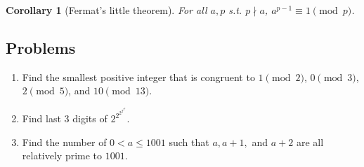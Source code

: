 \documentclass{article}
\theoremstyle{plain}
\newtheorem{corollary}{Corollary}
\numberwithin{equation}{section}
\begin{document}
\begin{corollary}[Fermat's little theorem]
For all $a, p$ s.t. $p\nmid a$, $a^{p - 1}\equiv 1\pmod{p}$.
\end{corollary}
\subsection*{Problems}

\begin{enumerate}
\item Find the smallest positive integer that is congruent to $1\pmod{2}$, $0\pmod{3}$, $2\pmod{5}$, and $10\pmod{13}$.
\item Find last 3 digits of $2^{2^{2^{2^{2^2}}}}$.
\item Find the number of $0 < a\le 1001$ such that $a, a + 1,$ and $ a + 2$ are all relatively prime to $1001$.
\end{enumerate}
\end{document}
